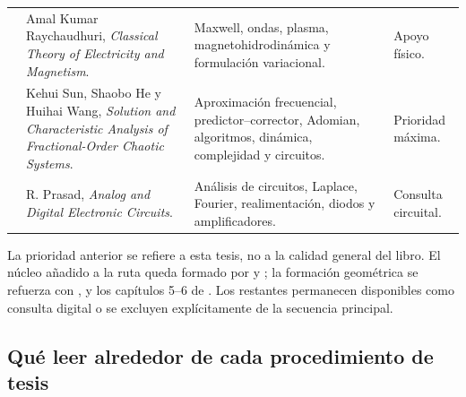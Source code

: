 \begin{longtable}{@{}L{3.10cm}L{4.35cm}L{4.35cm}L{2.70cm}@{}}
 &
Amal Kumar Raychaudhuri, \emph{Classical Theory of Electricity and Magnetism}. &
Maxwell, ondas, plasma, magnetohidrodinámica y formulación variacional. &
Apoyo físico. \\
 &
Kehui Sun, Shaobo He y Huihai Wang, \emph{Solution and Characteristic Analysis
of Fractional-Order Chaotic Systems}. &
Aproximación frecuencial, predictor--corrector, Adomian, algoritmos, dinámica,
complejidad y circuitos. & Prioridad máxima. \\
 &
R. Prasad, \emph{Analog and Digital Electronic Circuits}. &
Análisis de circuitos, Laplace, Fourier, realimentación, diodos y
amplificadores. & Consulta circuital. \\
\bottomrule
\end{longtable}

La prioridad anterior se refiere a esta tesis, no a la calidad general del
libro. El núcleo añadido a la ruta queda formado por
 y ; la formación
geométrica se refuerza con ,
 y los capítulos 5--6 de
. Los restantes permanecen disponibles como
consulta digital o se excluyen explícitamente de la secuencia principal.

\subsection{Qué leer alrededor de cada procedimiento de tesis}
\label{sec:lecturas-por-procedimiento}

